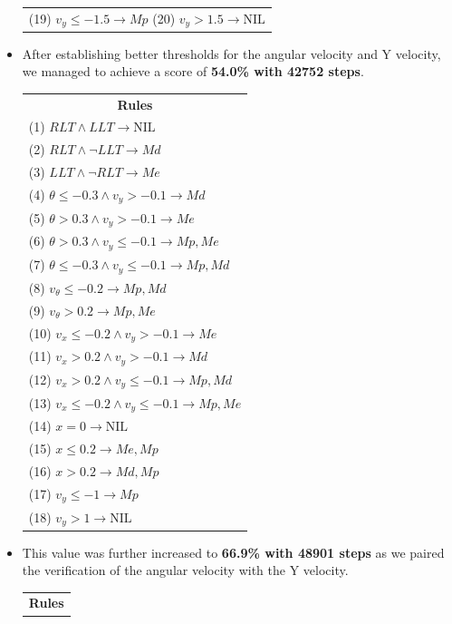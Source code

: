 \documentclass[a4paper, 12pt, fleqn]{report}
\begin{document}
\begin{itemize}
\begin{table}[h!]
\begin{tabular}{p{16cm}}
        (19) $v_y \leq -1.5 \rightarrow Mp$  
        (20) $v_y > 1.5 \rightarrow \text{NIL}$ \\
        \end{tabular}
    \end{table}

    \newpage
    \item After establishing better thresholds for the angular velocity and Y velocity, we managed to achieve a score of \textbf{54.0\% with 42752 steps}.
    \begin{table}[h!]
        \begin{tabular}{p{16cm}} 
        \multicolumn{1}{c}{\textbf{Rules}} \\             
(1) $RLT \land LLT \rightarrow \text{NIL}$ \\  
(2) $RLT \land \neg LLT \rightarrow Md$ \\  
(3) $LLT \land \neg RLT \rightarrow Me$ \\  
(4) $\theta \leq -0.3 \land v_y > -0.1 \rightarrow Md$ \\  
(5) $\theta > 0.3 \land v_y > -0.1 \rightarrow Me$ \\  
(6) $\theta > 0.3 \land v_y \leq -0.1 \rightarrow Mp, Me$ \\  
(7) $\theta \leq -0.3 \land v_y \leq -0.1 \rightarrow Mp, Md$ \\  
(8) $v_\theta \leq -0.2 \rightarrow Mp, Md$ \\  
(9) $v_\theta > 0.2 \rightarrow Mp, Me$ \\  
(10) $v_x \leq -0.2  \land v_y > -0.1 \rightarrow Me$ \\  
(11) $v_x > 0.2  \land v_y > -0.1 \rightarrow Md$ \\  
(12) $v_x > 0.2 \land v_y \leq -0.1 \rightarrow Mp, Md$ \\  
(13) $v_x \leq -0.2 \land v_y \leq -0.1 \rightarrow Mp, Me$ \\  
(14) $x = 0 \rightarrow \text{NIL}$ \\  
(15) $x \leq 0.2   \rightarrow  Me, Mp$ \\  
(16) $x > 0.2   \rightarrow  Md, Mp$ \\  
(17) $v_y \leq -1 \rightarrow Mp$ \\  
(18) $v_y > 1 \rightarrow \text{NIL}$ \\  

        \end{tabular}
    \end{table}


    \item This value was further increased to \textbf{66.9\% with 48901 steps} as we paired the verification of the angular velocity with the Y velocity.
    \begin{table}[h!]
        \begin{tabular}{p{16cm}} 
        \multicolumn{1}{c}{\textbf{Rules}} \\     


\end{tabular}
\end{table}
\end{itemize}
\end{document}
